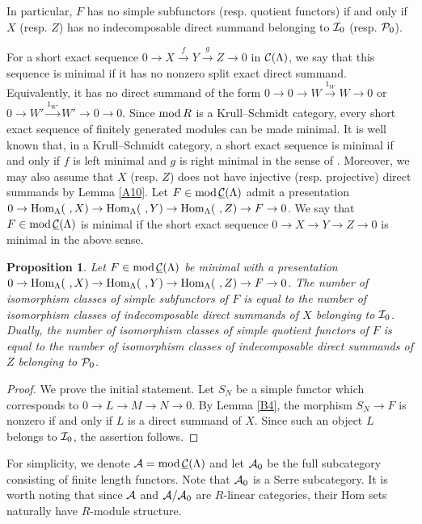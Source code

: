 \documentclass[11pt]{amsart}
\newtheorem{proposition}[theorem]{Proposition}
\theoremstyle{definition}
\numberwithin{equation}{section}
\begin{document}
In particular, $F$ has no simple subfunctors (resp. quotient functors) if and only if $X$ (resp. $Z$) has no indecomposable direct summand belonging to $\II_0$ (resp. $\PP_0$). 

For a short exact sequence $0\to X \xrightarrow{f} Y \xrightarrow{g} Z \to 0$ in $\CML$, we say that this sequence is minimal if it has no nonzero split exact direct summand. 
Equivalently, it has no direct summand of the form $0 \to 0 \to W \xrightarrow{1_W} W \to 0$ or $0 \to W' \xrightarrow{1_{W'}} W' \to 0 \to 0$.  
Since $\modR$ is a Krull--Schmidt category, every short exact sequence of finitely generated modules can be made minimal. 
It is well known that, in a Krull--Schmidt category, a short exact sequence is minimal if and only if $f$ is left minimal and $g$ is right minimal in the sense of \cite[$\S$1]{ARS}.
Moreover, we may also assume that $X$ (resp. $Z$) does not have injective (resp. projective) direct summands by Lemma \ref{A10}. 
Let $F \in \modsCML$ admit a presentation $0 \to \HomL (\  , X) \to \HomL (\  , Y) \to \HomL (\   , Z) \to F \to 0$. 
We say that $F \in \modsCML$ is minimal if the short exact sequence $0 \to X \to Y \to Z \to 0$ is minimal in the above sense. 


\begin{proposition}\label{B5}
Let $F \in \modsCML$ be minimal with a presentation $0 \to \HomL (\  , X) \to \HomL (\  , Y) \to \HomL (\   , Z) \to F \to 0$. 
The number of isomorphism classes of simple subfunctors of $F$ is equal to the number of isomorphism classes of indecomposable direct summands of $X$ belonging to $\II_0$. 
Dually, the number of isomorphism classes of simple quotient functors of $F$ is equal to the number of isomorphism classes of indecomposable direct summands of $Z$ belonging to $\PP_0$. 
\end{proposition}


\begin{proof}
We prove the initial statement. 
Let $S_N$ be a simple functor which corresponds to $0 \to L \to M \to N \to 0$. 
By Lemma \ref{B4}, the morphism $S_N \to F$ is nonzero if and only if $L$ is a direct summand of $X$. 
Since such an object $L$ belongs to $\II_0$, the assertion follows.
\end{proof}



For simplicity, we denote $\AA = \modsCML$ and let $\AA_0$ be the full subcategory consisting of finite length functors. 
Note that $\AA_0$ is a Serre subcategory. 
It is worth noting that since $\AA$ and $\AA / \AA_0$ are $R$-linear categories, their Hom sets naturally have $R$-module structure. 
\end{document}
